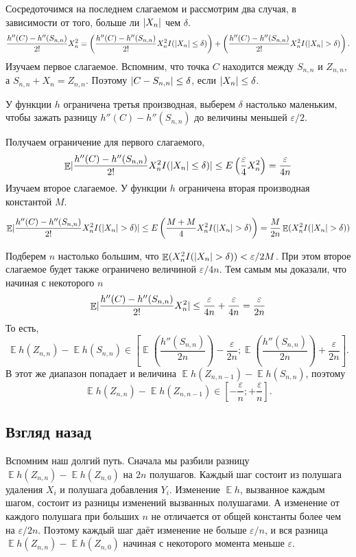 \documentclass[
  letterpaper,
  DIV=11,
  numbers=noendperiod]{scrartcl}
\DeclareMathOperator{\E}{\mathbb{E}}
\DeclarePairedDelimiter{\abs}{\lvert}{\rvert}
\begin{document}
Сосредоточимся на последнем слагаемом и рассмотрим два случая, в
зависимости от того, больше ли \(\abs{X_n}\) чем \(\delta\). \[
\frac{h''(C) - h''(S_{n,n})}{2!}X_n^2 = \left(\frac{h''(C) - h''(S_{n,n})}{2!}X_n^2I(\abs{X_n} \leq \delta)\right) + \left(\frac{h''(C) - h''(S_{n,n})}{2!}X_n^2I(\abs{X_n} > \delta)\right).
\] Изучаем первое слагаемое. Вспомним, что точка \(C\) находится между
\(S_{n,n}\) и \(Z_{n,n}\), а \(S_{n,n} + X_n = Z_{n,n}\). Поэтому
\(\abs{C - S_{n,n}} \leq \delta\), если \(\abs{X_n}\leq \delta\).

У функции \(h\) ограничена третья производная, выберем \(\delta\)
настолько маленьким, чтобы зажать разницу \(h''(C) - h''(S_{n,n})\) до
величины меньшей \(\varepsilon/2\).

Получаем ограничение для первого слагаемого, \[
\E\abs{\frac{h''(C) - h''(S_{n,n})}{2!}X_n^2I(\abs{X_n} \leq \delta)} \leq E\left(\frac{\varepsilon}{4}X_n^2\right)=\frac{\varepsilon}{4n}
\] Изучаем второе слагаемое. У функции \(h\) ограничена вторая
производная константой \(M\).

\[
\E\abs{\frac{h''(C) - h''(S_{n,n})}{2!}X_n^2I(\abs{X_n} > \delta)} \leq E\left(\frac{M + M}{4}X_n^2I(\abs{X_n} > \delta)\right)=\frac{M}{2n}\E(X_n^2I(\abs{X_n} > \delta))
\]

Подберем \(n\) настолько большим, что
\(\E(X_n^2 I(\abs{X_n} > \delta)) < \varepsilon/2M\). При этом второе
слагаемое будет также ограничено величиной \(\varepsilon/4n\). Тем самым
мы доказали, что начиная с некоторого \(n\) \[
\E\abs{\frac{h''(C) - h''(S_{n,n})}{2!}X_n^2 } \leq \frac{\varepsilon}{4n} + \frac{\varepsilon}{4n} = \frac{\varepsilon}{2n}
\] То есть, \[
\E h(Z_{n,n}) - \E h(S_{n,n}) \in \left[ \E\left(\frac{h''(S_{n,n})}{2n}\right) - \frac{\varepsilon}{2n}; \E\left(\frac{h''(S_{n,n})}{2n}\right) + \frac{\varepsilon}{2n} \right].
\] В этот же диапазон попадает и величина
\(\E h(Z_{n,n-1}) - \E h(S_{n,n})\), поэтому \[
\E h(Z_{n,n}) - \E h(Z_{n,n-1}) \in \left[ - \frac{\varepsilon}{n}; + \frac{\varepsilon}{n} \right].
\]

\subsection{Взгляд
назад}\label{ux432ux437ux433ux43bux44fux434-ux43dux430ux437ux430ux434}

Вспомним наш долгий путь. Сначала мы разбили разницу
\(\E h(Z_{n,n}) - \E h(Z_{n,0})\) на \(2n\) полушагов. Каждый шаг
состоит из полушага удаления \(X_i\) и полушага добавления \(Y_i\).
Изменение \(\E h\), вызванное каждым шагом, состоит из разницы изменений
вызванных полушагами. А изменение от каждого полушага при больших \(n\)
не отличается от общей константы более чем на \(\varepsilon/2n\).
Поэтому каждый шаг даёт изменение не больше \(\varepsilon/n\), и вся
разница \(\E h(Z_{n,n}) - \E h(Z_{n,0})\) начиная с некоторого момента
меньше \(\varepsilon\).
\end{document}
